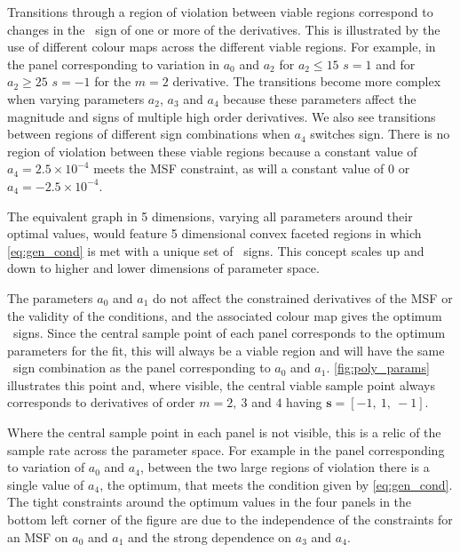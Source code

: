 Transitions through a region of violation between viable regions correspond to changes in the \maxsmooth~sign of one or more of the derivatives. This is illustrated by the use of different colour maps across the different viable regions. For example, in the panel corresponding to variation in $a_0$ and $a_2$ for $a_2 \leq 15$ $s = 1$ and for $a_2 \geq 25$ $s = -1$ for the $m = 2$ derivative. The transitions become more complex when varying parameters $a_2$, $a_3$ and $a_4$ because these parameters affect the magnitude and signs of multiple high order derivatives. We also see transitions between regions of different sign combinations when $a_4$ switches sign. %
There is no region of violation between these viable regions because a constant value of $a_4 = 2.5\times 10^{-4}$ meets the MSF constraint, as will a constant value of $0$ or $a_4 = -2.5\times 10^{-4}$.

The equivalent graph in 5 dimensions, varying all parameters around their optimal values, would feature 5 dimensional convex faceted regions in which \cref{eq:gen_cond} is met with a unique set of \maxsmooth~signs. This concept scales up and down to higher and lower dimensions of parameter space.

The parameters $a_0$ and $a_1$ do not affect the constrained derivatives of the MSF or the validity of the conditions, and the associated colour map gives the optimum \maxsmooth~signs. Since the central sample point of each panel corresponds to the optimum parameters for the fit, this will always be a viable region and will have the same \maxsmooth~sign combination as the panel corresponding to $a_0$ and $a_1$. \cref{fig:poly_params} illustrates this point and, where visible, the central viable sample point always corresponds to derivatives of order $m = 2,~3$ and $4$ having $\mathbf{s} = [-1,~1,~-1]$. 

Where the central sample point in each panel is not visible, this is a relic of the sample rate across the parameter space. For example in the panel corresponding to variation of $a_0$ and $a_4$, between the two large regions of violation there is a single value of $a_4$, the optimum, that meets the condition given by \cref{eq:gen_cond}. The tight constraints around the optimum values in the four panels in the bottom left corner of the figure are due to the independence of the constraints for an MSF on $a_0$ and $a_1$ and the strong dependence on $a_3$ and $a_4$.

